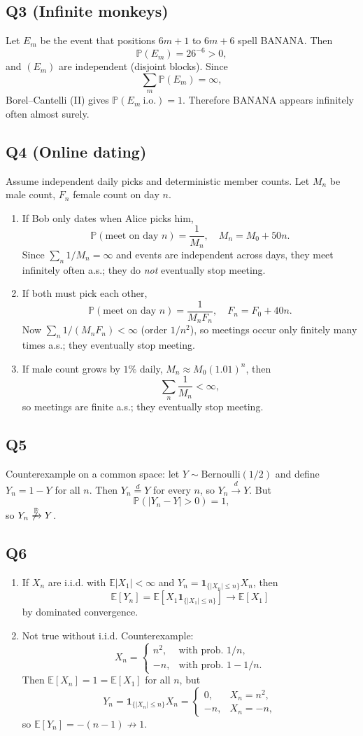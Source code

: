 \documentclass[11pt]{article}
\newcommand{\PP}{\mathbb{P}}
\newcommand{\EE}{\mathbb{E}}
\newcommand{\1}{\mathbf{1}}
\begin{document}
\subsection*{Q3 (Infinite monkeys)}
Let $E_m$ be the event that positions $6m+1$ to $6m+6$ spell BANANA. Then
\[
\PP(E_m)=26^{-6}>0,
\]
and $(E_m)$ are independent (disjoint blocks). Since
\[
\sum_m\PP(E_m)=\infty,
\]
Borel--Cantelli (II) gives $\PP(E_m\ \text{i.o.})=1$. Therefore BANANA appears infinitely often almost surely.

\subsection*{Q4 (Online dating)}
Assume independent daily picks and deterministic member counts.
Let $M_n$ be male count, $F_n$ female count on day $n$.
\begin{enumerate}[label=(\alph*)]
\item If Bob only dates when Alice picks him,
\[
\PP(\text{meet on day }n)=\frac1{M_n},\quad M_n=M_0+50n.
\]
Since $\sum_n1/M_n=\infty$ and events are independent across days, they meet infinitely often a.s.; they do \emph{not} eventually stop meeting.
\item If both must pick each other,
\[
\PP(\text{meet on day }n)=\frac1{M_nF_n},\quad F_n=F_0+40n.
\]
Now $\sum_n 1/(M_nF_n)<\infty$ (order $1/n^2$), so meetings occur only finitely many times a.s.; they eventually stop meeting.
\item If male count grows by $1\%$ daily, $M_n\approx M_0(1.01)^n$, then
\[
\sum_n\frac1{M_n}<\infty,
\]
so meetings are finite a.s.; they eventually stop meeting.
\end{enumerate}

\subsection*{Q5}
Counterexample on a common space: let $Y\sim\mathrm{Bernoulli}(1/2)$ and define $Y_n=1-Y$ for all $n$.
Then $Y_n\stackrel d=Y$ for every $n$, so $Y_n\xrightarrow d Y$. But
\[
\PP(|Y_n-Y|>0)=1,
\]
so $Y_n\not\xrightarrow{\PP}Y$.

\subsection*{Q6}
\begin{enumerate}[label=(\alph*)]
\item If $X_n$ are i.i.d. with $\EE|X_1|<\infty$ and $Y_n=\1_{\{|X_n|\le n\}}X_n$, then
\[
\EE[Y_n]=\EE[X_1\1_{\{|X_1|\le n\}}]\to\EE[X_1]
\]
by dominated convergence.
\item Not true without i.i.d. Counterexample:
\[
X_n=
\begin{cases}
n^2,&\text{with prob. }1/n,\\
-n,&\text{with prob. }1-1/n.
\end{cases}
\]
Then $\EE[X_n]=1=\EE[X_1]$ for all $n$, but
\[
Y_n=\1_{\{|X_n|\le n\}}X_n=
\begin{cases}
0,&X_n=n^2,\\
-n,&X_n=-n,
\end{cases}
\]
so $\EE[Y_n]=-(n-1)\not\to1$.
\end{enumerate}
\end{document}

